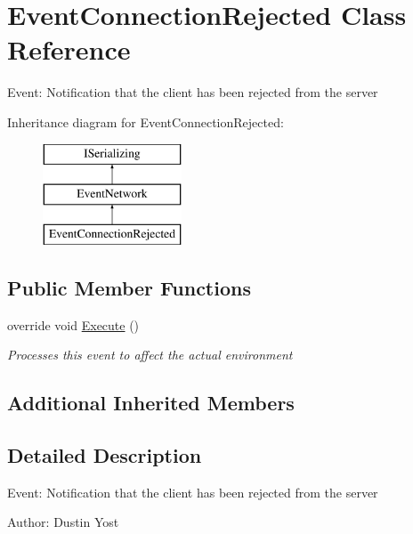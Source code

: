 \hypertarget{class_event_connection_rejected}{\section{Event\-Connection\-Rejected Class Reference}
\label{class_event_connection_rejected}
}


Event\-: Notification that the client has been rejected from the server  


Inheritance diagram for Event\-Connection\-Rejected\-:\begin{figure}[H]
\begin{center}
\leavevmode
\includegraphics[height=3.000000cm]{class_event_connection_rejected}
\end{center}
\end{figure}
\subsection*{Public Member Functions}
\begin{DoxyCompactItemize}
\item 
override void \hyperlink{class_event_connection_rejected_a9d02c1d1f11f34b796a2429f6374c9ce}{Execute} ()
\begin{DoxyCompactList}\small\item\em Processes this event to affect the actual environment \end{DoxyCompactList}\end{DoxyCompactItemize}
\subsection*{Additional Inherited Members}


\subsection{Detailed Description}
Event\-: Notification that the client has been rejected from the server 

Author\-: Dustin Yost 

